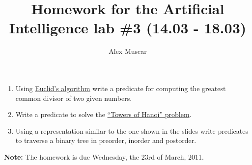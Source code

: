 \documentclass{article}
\begin{document}
    \title{Homework for the Artificial Intelligence lab \#3 (14.03 - 18.03)}
    \author{Alex Muscar}
    \maketitle

\begin{enumerate}[1.]
\item
  Using \href{http://en.wikipedia.org/wiki/Euclid\_algorithm}{Euclid's
  algorithm} write a predicate for computing the greatest common divisor
  of two given numbers.
\item
  Write a predicate to solve the
  \href{http://en.wikipedia.org/wiki/Tower\_of\_Hanoi}{``Towers of
  Hanoi'' problem}.
\item
  Using a representation similar to the one shown in the slides write
  predicates to traverse a binary tree in preorder, inorder and
  postorder.
\end{enumerate}
\textbf{Note:} The homework is due Wednesday, the 23rd of March, 2011.
\end{document}
